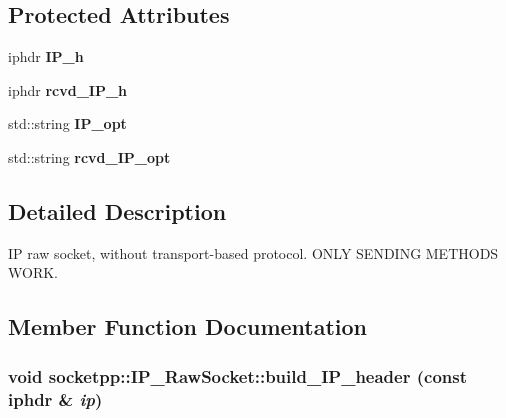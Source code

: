 \subsection*{Protected Attributes}
\begin{CompactItemize}
\item 
\hypertarget{classsocketpp_1_1IP__RawSocket_a8ddf1b2172c1e6f4b50d18c825978dc}{
iphdr \textbf{IP\_\-h}}
\label{classsocketpp_1_1IP__RawSocket_a8ddf1b2172c1e6f4b50d18c825978dc}

\item 
\hypertarget{classsocketpp_1_1IP__RawSocket_005f2299268c452f0e1689d070fa0cab}{
iphdr \textbf{rcvd\_\-IP\_\-h}}
\label{classsocketpp_1_1IP__RawSocket_005f2299268c452f0e1689d070fa0cab}

\item 
\hypertarget{classsocketpp_1_1IP__RawSocket_05761cfc5307ac731cb05fdc0f500469}{
std::string \textbf{IP\_\-opt}}
\label{classsocketpp_1_1IP__RawSocket_05761cfc5307ac731cb05fdc0f500469}

\item 
\hypertarget{classsocketpp_1_1IP__RawSocket_0457fe2b23f01b7304e2bf1441fc7300}{
std::string \textbf{rcvd\_\-IP\_\-opt}}
\label{classsocketpp_1_1IP__RawSocket_0457fe2b23f01b7304e2bf1441fc7300}

\end{CompactItemize}


\subsection{Detailed Description}
IP raw socket, without transport-based protocol. ONLY SENDING METHODS WORK. 

\subsection{Member Function Documentation}
\hypertarget{classsocketpp_1_1IP__RawSocket_f93c51a7a8284fe9d2b24019b13a5803}{
\subsubsection[{build\_\-IP\_\-header}]{\setlength{\rightskip}{0pt plus 5cm}void socketpp::IP\_\-RawSocket::build\_\-IP\_\-header (const iphdr \& {\em ip})}}
\label{classsocketpp_1_1IP__RawSocket_f93c51a7a8284fe9d2b24019b13a5803}



